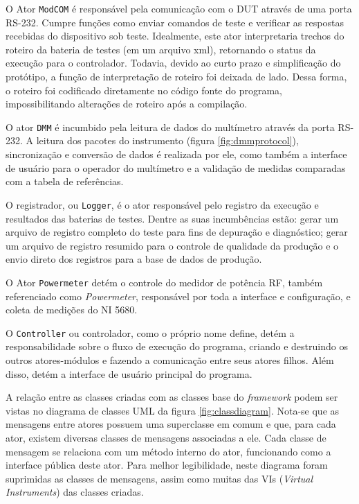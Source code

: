         O Ator \texttt{ModCOM} é responsável pela comunicação com o DUT através de uma porta RS-232. Cumpre funções como enviar comandos de teste e verificar as respostas recebidas do dispositivo sob teste. Idealmente, este ator interpretaria trechos do roteiro da bateria de testes (em um arquivo xml), retornando o status da execução para o controlador. Todavia, devido ao curto prazo e simplificação do protótipo, a função de interpretação de roteiro foi deixada de lado. Dessa forma, o roteiro foi codificado diretamente no código fonte do programa, impossibilitando alterações de roteiro após a compilação.
        
        O ator \texttt{DMM} é incumbido pela leitura de dados do multímetro através da porta RS-232. A leitura dos pacotes do instrumento (figura \ref{fig:dmmprotocol}), sincronização e conversão de dados é realizada por ele, como também a interface de usuário para o operador do multímetro e a validação de medidas comparadas com a tabela de referências. 
        
        O registrador, ou \texttt{Logger}, é o ator responsável pelo registro da execução e resultados das baterias de testes. Dentre as suas incumbências estão: gerar um arquivo de registro completo do teste para fins de depuração e diagnóstico; gerar um arquivo de registro resumido para o controle de qualidade da produção e o envio direto dos registros para a base de dados de produção. 
                
        O Ator \texttt{Powermeter} detém o controle do medidor de potência RF, também referenciado como \textit{Powermeter}, responsável por toda a interface e configuração, e coleta de medições do NI 5680.
         
        O \texttt{Controller} ou controlador, como o próprio nome define, detém a responsabilidade sobre o fluxo de execução do programa, criando e destruindo os outros atores-módulos e fazendo a comunicação entre seus atores filhos. Além disso, detém a interface de usuário principal do programa.
        
        A relação entre as classes criadas com as classes base do \textit{framework} podem ser vistas no diagrama de classes UML da figura \ref{fig:classdiagram}. Nota-se que as mensagens entre atores possuem uma superclasse em comum e que, para cada ator, existem diversas classes de mensagens associadas a ele. Cada classe de mensagem se relaciona com um método interno do ator, funcionando como a interface pública deste ator. 
        Para melhor legibilidade, neste diagrama foram suprimidas as classes de mensagens, assim como muitas das VIs (\textit{Virtual Instruments}) das classes criadas.
        
